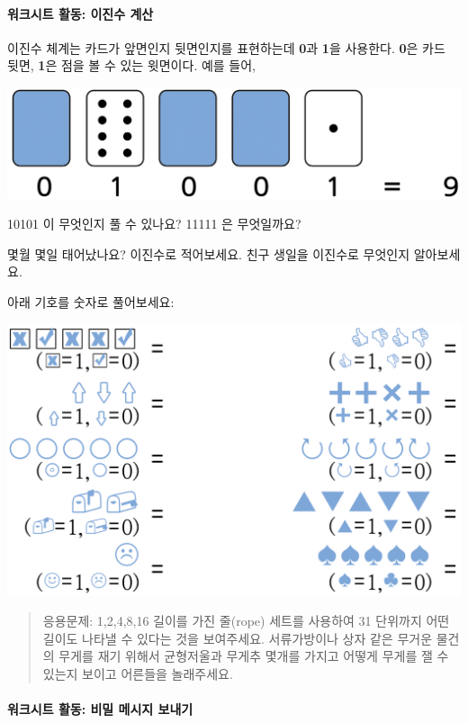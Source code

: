 \documentclass[]{article}
\begin{document}
\mbox{}\paragraph{워크시트 활동: 이진수 계산}\label{section-13}

이진수 체계는 카드가 앞면인지 뒷면인지를 표현하는데 \textbf{0}과
\textbf{1}을 사용한다. \textbf{0}은 카드 뒷면, \textbf{1}은 점을 볼 수
있는 윗면이다. 예를 들어,

\includegraphics{csunplugged/01-part/img/ch01-binary/01-binary-03-five-cards-yn.png}

10101 이 무엇인지 풀 수 있나요? 11111 은 무엇일까요?

몇월 몇일 태어났나요? 이진수로 적어보세요. 친구 생일을 이진수로 무엇인지
알아보세요.

아래 기호를 숫자로 풀어보세요:

\includegraphics{csunplugged/01-part/img/ch01-binary/01-binary-05-working-with-binary_02.png}

\begin{quote}
응용문제: 1,2,4,8,16 길이를 가진 줄(rope) 세트를 사용하여 31 단위까지
어떤 길이도 나타낼 수 있다는 것을 보여주세요. 서류가방이나 상자 같은
무거운 물건의 무게를 재기 위해서 균형저울과 무게추 몇개를 가지고 어떻게
무게를 잴 수 있는지 보이고 어른들을 놀래주세요.
\end{quote}

\mbox{}\paragraph{워크시트 활동: 비밀 메시지 보내기}\label{section-15}
\end{document}

